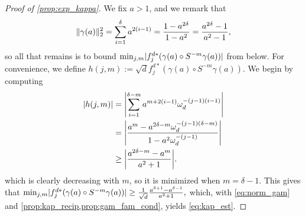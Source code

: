 \begin{proof}[Proof of \cref{prop:exp_kappa}]
  We fix $a > 1$, and we remark that \begin{equation}\lVert\gamma(a)\rVert_2^2 = \sum_{i = 1}^\delta a^{2(i - 1)} = \dfrac{1 - a^{2 \delta}}{1 - a^2} = \dfrac{a^{2 \delta} - 1}{a^2 - 1}, \label{eq:norm_gam} \end{equation} so all that remains is to bound $\min_{j, m} \lvert f_j^{d*}(\gamma(a) \circ S^{-m} \gamma(a))\rvert$ from below.  For convenience, we define $h(j, m) := \sqrt{d} f_j^{d*}(\gamma(a) \circ S^{-m} \gamma(a)).$  We begin by computing
  \begin{align}
    \abs{h(j, m)} &= \abs*{\sum_{i = 1}^{\delta - m} a^{m + 2 (i - 1)} \omega_d^{-(j - 1)(i - 1)}} \nonumber\\
    &= \abs*{\dfrac{a^m - a^{2 \delta - m} \omega_d^{-(j - 1)(\delta - m)}}{1 - a^2 \omega_d^{-(j - 1)}}} \nonumber\\
    &\ge \abs*{\dfrac{a^{2 \delta - m} - a^m}{a^2 + 1}}.\label{eq:ek_bound}
  \end{align}
  which is clearly decreasing with $m$, so it is minimized when $m = \delta - 1$.  This gives that $\min_{j, m} \lvert f_j^{d*}(\gamma(a) \circ S^{-m} \gamma(a))\rvert \ge \frac{1}{\sqrt{d}} \frac{a^{\delta + 1} - a^{\delta - 1}}{a^2 + 1},$ which, with \eqref{eq:norm_gam} and \cref{prop:kap_recip,prop:gam_fam_cond}, yields \eqref{eq:kap_est}.


\end{proof}
